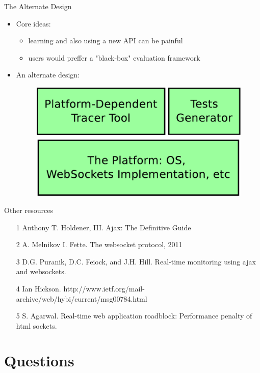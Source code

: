 \documentclass{soa.cs.pub.ro}
\begin{document}
\begin{frame}{The Alternate Design}
  \begin{itemize}
    \item Core ideas:
      \begin{itemize}
        \item learning and also using a new API can be painful
        \item users would preffer a "black-box" evaluation framework
      \end{itemize}
    \item An alternate design:
      \begin{figure}
         \includegraphics[scale=0.25]{img/architecture2.pdf}
      \end{figure}
  \end{itemize}
\end{frame}

\begin{frame}{Other resources}
  \begin{itemize}
    \item [1] Anthony T. Holdener, III. Ajax: The Definitive Guide
    \item [2] A. Melnikov I. Fette. The websocket protocol, 2011
    \item [3] D.G. Puranik, D.C. Feiock, and J.H. Hill. Real-time
              monitoring using ajax and websockets.
    \item [4] Ian Hickson.
      http://www.ietf.org/mail-archive/web/hybi/current/msg00784.html
    \item [5] S. Agarwal. Real-time web application roadblock: Performance
      penalty of html sockets.
  \end{itemize}
\end{frame}

\section{Questions}
\end{document}
